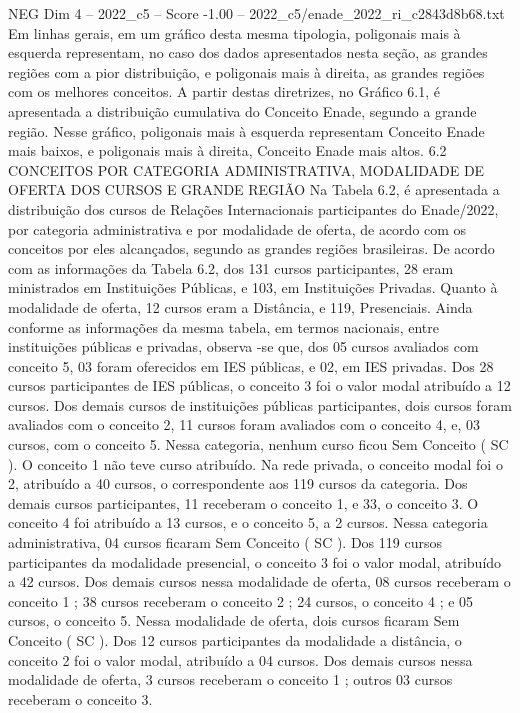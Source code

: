 \begin{textsample}{NEG Dim 4 – 2022\_c5 – Score -1.00 – 2022\_c5/enade\_2022\_ri\_c2843d8b68.txt}
Em linhas gerais, em um gráfico desta mesma tipologia, poligonais mais à esquerda representam, no caso dos dados apresentados nesta seção, as grandes regiões com a pior distribuição, e poligonais mais à direita, as grandes regiões com os melhores conceitos.
A partir destas diretrizes, no Gráfico 6.1, é apresentada a distribuição cumulativa do Conceito Enade, segundo a grande região.
Nesse gráfico, poligonais mais à esquerda representam Conceito Enade mais baixos, e poligonais mais à direita, Conceito Enade mais altos. 6.2 CONCEITOS POR CATEGORIA ADMINISTRATIVA, MODALIDADE DE OFERTA DOS CURSOS E GRANDE REGIÃO Na Tabela 6.2, é apresentada a distribuição dos cursos de Relações Internacionais participantes do Enade/2022, por categoria administrativa e por modalidade de oferta, de acordo com os conceitos por eles alcançados, segundo as grandes regiões brasileiras.
De acordo com as informações da Tabela 6.2, dos 131 cursos participantes, 28 eram ministrados em Instituições Públicas, e 103, em Instituições Privadas.
Quanto à modalidade de oferta, 12 cursos eram a Distância, e 119, Presenciais.
Ainda conforme as informações da mesma tabela, em termos nacionais, entre instituições públicas e privadas, observa -se que, dos 05 cursos avaliados com conceito 5, 03 foram oferecidos em IES públicas, e 02, em IES privadas.
Dos 28 cursos participantes de IES públicas, o conceito 3 foi o valor modal atribuído a 12 cursos.
Dos demais cursos de instituições públicas participantes, dois cursos foram avaliados com o conceito 2, 11 cursos foram avaliados com o conceito 4, e, 03 cursos, com o conceito 5.
Nessa categoria, nenhum curso ficou Sem Conceito ( SC ).
O conceito 1 não teve curso atribuído.
Na rede privada, o conceito modal foi o 2, atribuído a 40 cursos, o correspondente aos 119 cursos da categoria.
Dos demais cursos participantes, 11 receberam o conceito 1, e 33, o conceito 3.
O conceito 4 foi atribuído a 13 cursos, e o conceito 5, a 2 cursos.
Nessa categoria administrativa, 04 cursos ficaram Sem Conceito ( SC ).
Dos 119 cursos participantes da modalidade presencial, o conceito 3 foi o valor modal, atribuído a 42 cursos.
Dos demais cursos nessa modalidade de oferta, 08 cursos receberam o conceito 1 ; 38 cursos receberam o conceito 2 ; 24 cursos, o conceito 4 ; e 05 cursos, o conceito 5.
Nessa modalidade de oferta, dois cursos ficaram Sem Conceito ( SC ).
Dos 12 cursos participantes da modalidade a distância, o conceito 2 foi o valor modal, atribuído a 04 cursos.
Dos demais cursos nessa modalidade de oferta, 3 cursos receberam o conceito 1 ; outros 03 cursos receberam o conceito 3.

\end{textsample}
